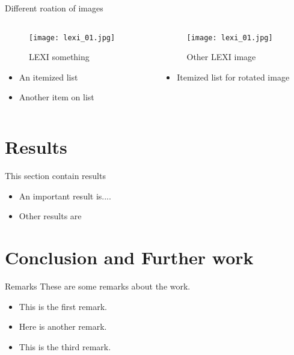 \documentclass[10pt,xcolor=table]{beamer}
\begin{document}
\begin{frame}{Different roation of images}
    \begin{columns}
        \begin{column}{0.5\textwidth}
            \begin{figure}
                \texttt{[image: lexi\_01.jpg]}
                \caption{LEXI something}
            \end{figure}
            \begin{itemize}
                \item An itemized list
                \item Another item on list
            \end{itemize}
        \end{column}
        \begin{column}{0.5\textwidth}
            \begin{figure}
                \texttt{[image: lexi\_01.jpg]}
                \caption{Other LEXI image}
            \end{figure}
            \begin{itemize}
                \item Itemized list for rotated image
            \end{itemize}
        \end{column}
        \vspace{0.25cm}
    \end{columns}
\end{frame}


    \section{Results}
    \begin{frame}{This section contain results}
        \begin{itemize}
            \item An important result is....
            \item Other results are 
        \end{itemize}  
    \end{frame}

    \section{Conclusion and Further work}
    \begin{frame}{Remarks}
        These are some remarks about the work.
        \begin{itemize}
            \item This is the first remark.
            \item Here is another remark.
            \item This is the third remark.
        \end{itemize}
    \end{frame}
\end{document}
